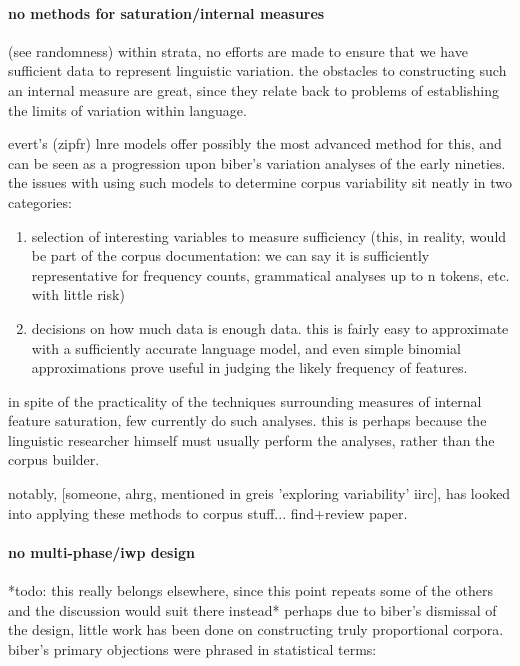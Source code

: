 \paragraph{ no methods for saturation/internal measures}
(see randomness)
within strata, no efforts are made to ensure that we have sufficient data to represent linguistic variation.  the obstacles to constructing such an internal measure are great, since they relate back to problems of establishing the limits of variation within language.

evert's (zipfr) lnre models offer possibly the most advanced method for this, and can be seen as a progression upon biber's variation analyses of the early nineties.  the issues with using such models to determine corpus variability sit neatly in two categories:

\begin{enumerate}
 \item selection of interesting variables to measure sufficiency (this, in reality, would be part of the corpus documentation: we can say it is sufficiently representative for frequency counts, grammatical analyses up to n tokens, etc. with little risk)
 \item decisions on how much data is enough data.  this is fairly easy to approximate with a sufficiently accurate language model, and even simple binomial approximations prove useful in judging the likely frequency of features.
\end{enumerate}

in spite of the practicality of the techniques surrounding measures of internal feature saturation, few currently do such analyses.  this is perhaps because the linguistic researcher himself must usually perform the analyses, rather than the corpus builder.

notably, [someone, ahrg, mentioned in greis 'exploring variability' iirc], has looked into applying these methods to corpus stuff... find+review paper.



\paragraph{ no multi-phase/iwp design}
*todo: this really belongs elsewhere, since this point repeats some of the others and the discussion would suit there instead*
perhaps due to biber's dismissal of the design, little work has been done on constructing truly proportional corpora.  biber's primary objections were phrased in statistical terms:

